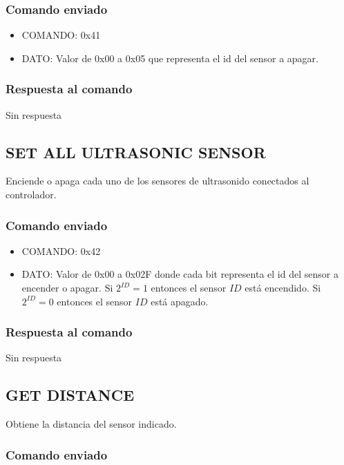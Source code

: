 \documentclass[a4paper,10pt]{article}
\begin{document}
\subsubsection*{Comando enviado}

\begin{itemize}
	\item{COMANDO:} 0x41
	\item{DATO:} Valor de 0x00 a 0x05 que representa el id del sensor a apagar.
\end{itemize}

\subsubsection*{Respuesta al comando}

Sin respuesta

\subsection{SET ALL ULTRASONIC SENSOR}
\label{set_all_ultrasonic_sensor}

Enciende o apaga cada uno de los sensores de ultrasonido conectados al controlador.

\subsubsection*{Comando enviado}

\begin{itemize}
	\item{COMANDO:} 0x42
	\item{DATO:} Valor de 0x00 a 0x02F donde cada bit representa el id del sensor a encender o apagar.
	Si $2^{ID} = 1$ entonces el sensor $ID$ est\'a encendido.
	Si $2^{ID} = 0$ entonces el sensor $ID$ est\'a apagado.
\end{itemize}

\subsubsection*{Respuesta al comando}

Sin respuesta

\subsection{GET DISTANCE}
\label{get_distance_us}

Obtiene la distancia del sensor indicado.

\subsubsection*{Comando enviado}
\end{document}
